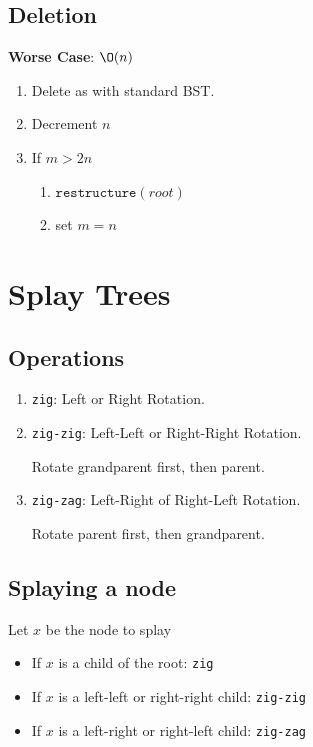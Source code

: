 \documentclass[12pt, letterpaper]{article}
\begin{document}
\begin{multicols*}{3}
        
        
        \subsection{Deletion}

        {\bf Worse Case}: $\O(n)$
        
        \begin{enumerate}
            \item Delete as with standard BST.
            \item Decrement $n$
            \item If $m > 2n$
            \begin{enumerate}[label=\roman*.]
                \item $\texttt{restructure}(root)$
                \item set $m = n$
            \end{enumerate}
        \end{enumerate}


        
        
        \section{Splay Trees}

        \subsection{Operations}
        \begin{enumerate}
            \item \texttt{zig}: Left or Right Rotation.
            \item \texttt{zig-zig}: Left-Left or Right-Right Rotation.

            Rotate grandparent first, then parent.
            
            \item \texttt{zig-zag}: Left-Right of Right-Left Rotation.

            Rotate parent first, then grandparent.
        \end{enumerate}


        \subsection{Splaying a node}
        Let $x$ be the node to splay
        \begin{itemize}
            \item If $x$ is a child of the root: \texttt{zig}
            \item If $x$ is a left-left or right-right child: \texttt{zig-zig}
            \item If $x$ is a left-right or right-left child: \texttt{zig-zag}
        \end{itemize}
        

\end{multicols*}
\end{document}
